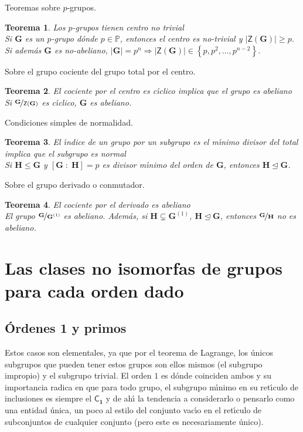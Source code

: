 \documentclass[final,12pt,a4paper,twoside,fleqn]{extbook}
\newcommand{\sthen}{\ensuremath{         \Rightarrow         }}
\newcommand{\entreparentesis}[1]{\ensuremath{
        \left({#1}\right)
}}
\newcommand{\entrecorchetes}[1]{\ensuremath{
        \left\lbrack{#1}\right\rbrack
}}
\newcommand{\then}{\ensuremath{\sthen}}
\newcommand{\set}[1]{\ensuremath{\left\lbrace{#1}\right\rbrace}}
\newcommand{\setP}{\ensuremath{}\mathbb{P}}
\newcommand{\grG}{\ensuremath{\mathbf{G}}}
\newcommand{\grH}{\ensuremath{\mathbf{H}}}
\newcommand{\subgreq}{\ensuremath{\leqslant}}
\newcommand{\normsubgreq}{\ensuremath{\trianglelefteq}}
\newcommand{\grcoc}[2]{\ensuremath{
        \nicefrac{#1}{#2}
}}
\newcommand{\grclass}[1]{\ensuremath{\mathsf{#1}}}
\newcommand{\trivialgr}{\ensuremath{{\grclass{C}}_{\mathbf{1}}}}
\newcommand{\centro}[1]{\ensuremath{
        {\mathsf{Z}}
        {\left({#1}\right)}
}}
\newcommand{\indice}[2]{\ensuremath{\entrecorchetes{{#1}\;:\;{#2}}}}
\newcommand{\grderivado}[2]{\ensuremath{
        {#1}^{\entreparentesis{#2}}
}}
\newtheorem{thm}{Teorema}[chapter]
\theoremstyle{definition}
\theoremstyle{remark}
\begin{document}
Teoremas sobre $p$-grupos.
\begin{thm}{Los $p$-grupos tienen centro no trivial\\}{\label{CentroP-GrupoNoTrivial}}
    Si $\grG$ es un $p$-grupo d\'onde $p  \in \setP$, entonces el centro es no-trivial y $\left|\centro{\grG}\right|\geq p$. Si adem\'as $\grG$ es no-abeliano, $\left| \grG\right|=p^n \then \left|\centro{\grG}\right|  \in \set{p,p^2,\ldots,p^{n-2}}$.
\end{thm}


Sobre el grupo cociente del grupo total por el centro.
\begin{thm}{El cociente por el centro es c{\'{\i}}clico implica que el grupo es abeliano\\}{\label{CocientePorCentroCiclicoYAbelianidad}}
    Si $\grcoc{\grG}{\centro{\grG}}$ es c{\'{\i}}clico, $\grG$ es abeliano.
\end{thm}


Condiciones simples de normalidad.
\begin{thm}{El {\'{\i}}ndice de un grupo por un subgrupo es el m{\'{\i}}nimo divisor del total implica que el subgrupo es normal\\}{\label{IndiceYNormalidad}}
    Si $\grH\subgreq\grG$ y $\indice{\grG}{\grH}=p$ es divisor m{\'{\i}}nimo del orden de $\grG$, entonces $\grH\normsubgreq\grG$.
\end{thm}


Sobre el grupo derivado o conmutador.
\begin{thm}{El cociente por el derivado es abeliano\\}{\label{DerivadoYAbelianidad}}
    El grupo $\grcoc{\grG}{\grderivado{\grG}{1}}$ es abeliano. Adem\'as, si $\grH  \subsetneq {\grderivado{\grG}{1}}$, $\grH\unlhd\grG$,
    entonces  $\grcoc{\grG}{\grH}$ no es abeliano.
\end{thm}


\chapter{Las clases no isomorfas de grupos para cada orden dado}

\section{{\'O}rdenes 1 y primos}

Estos casos son elementales, ya que por el teorema de Lagrange, los \'unicos subgrupos que pueden tener estos grupos son ellos mismos (el subgrupo impropio) y el subgrupo trivial. El orden $1$ es d\'onde coinciden ambos y su importancia radica en que para todo grupo, el subgrupo m{\'{\i}}nimo en su ret{\'{\i}}culo de inclusiones es siempre el $\trivialgr$ y de ah{\'{\i}} la tendencia a considerarlo o pensarlo como una entidad \'unica, un poco al estilo del conjunto vac{\'{\i}}o en el ret{\'{\i}}culo de subconjuntos de cualquier conjunto (pero este es necesariamente \'unico).
\end{document}
